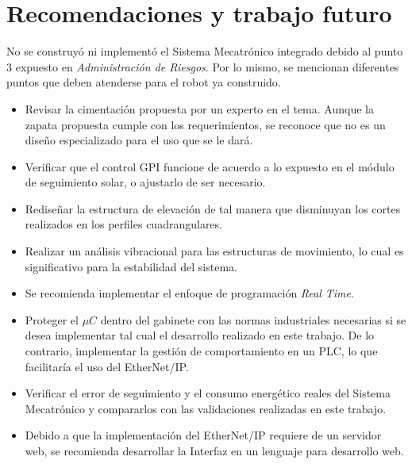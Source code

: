 \section{Recomendaciones y trabajo futuro}
No se construyó ni implementó el Sistema Mecatrónico integrado debido al punto 3 expuesto en \textit{Administración de Riesgos}. Por lo mismo, se mencionan diferentes puntos que deben atenderse para el robot ya construido.
\begin{itemize}
    \item Revisar la cimentación propuesta por un experto en el tema. Aunque la zapata propuesta cumple con los requerimientos, se reconoce que no es un diseño especializado para el uso que se le dará.
    \item Verificar que el control GPI funcione de acuerdo a lo expuesto en el módulo de seguimiento solar, o ajustarlo de ser necesario.
    \item Rediseñar la estructura de elevación de tal manera que disminuyan los cortes realizados en los perfiles cuadrangulares.
    \item Realizar un análisis vibracional para las estructuras de movimiento, lo cual es significativo para la estabilidad del sistema.
    \item Se recomienda implementar el enfoque de programación \textit{Real Time}.
    \item Proteger el $ \mu C $ dentro del gabinete con las normas industriales necesarias si se desea implementar tal cual el desarrollo realizado en este trabajo. De lo contrario, implementar la gestión de comportamiento en un PLC, lo que facilitaría el uso del EtherNet/IP.
    \item Verificar el error de seguimiento y el consumo energético reales del Sistema Mecatrónico y compararlos con las validaciones realizadas en este trabajo.
    \item Debido a que la implementación del EtherNet/IP requiere de un servidor web, se recomienda desarrollar la Interfaz en un lenguaje para desarrollo web.
\end{itemize}

